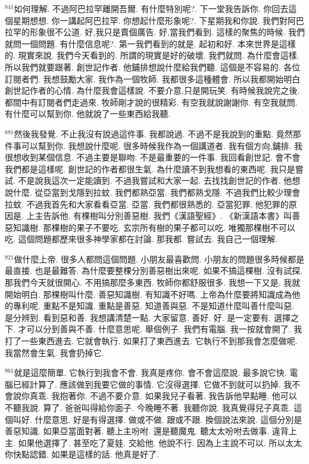 \documentclass{book}
\begin{document}
$^{841}$如何理解.
不過阿巴拉罕離開吾爾.
有什麼特別呢?.
下一堂我告訴你.
你回去這個星期想想.
你一講起阿巴拉罕.
你想起什麼形象呢?.
下星期我和你說.
我們對阿巴拉罕的形象很不公道.
好,我只是賣個廣告.
好,當我們看到.
這樣的聚焦的時候.
我們就問一個問題.
有什麼信息呢?.
第一我們看到的就是.
起初和好.
本來世界是這樣的.
現實來說.
我們今天看到的.
所謂的現實是好的破壞.
我們就問.
為什麼會這樣.
所以我們就要跟著.
創世記作者.
他鋪排想說什麼給我們聽.
這個是不容易的.
各位訂閱者們.
我想鼓勵大家.
我作為一個牧師.
我都很多這種體會.
所以我都開始明白創世記作者的心情.
為什麼我會這樣說.
不要介意,只是開玩笑.
有時候我說完之後.
都間中有訂閱者們走過來.
牧師剛才說的很精彩.
有空我就說謝謝你.
有空我就問.
有什麼可以幫到你.
他就說了一些東西給我聽.

$^{881}$然後我發覺.
不止我沒有說過這件事.
我都說過.
不過不是我說到的重點.
竟然那件事可以幫到你.
我想說什麼呢.
很多時候我作為一個講道者.
我有個方向,鋪排.
我很想收到某個信息.
不過主要是聯吻.
不是最重要的一件事.
我回看創世記.
會不會我們都是這樣呢.
創世記的作者都很生氣.
為什麼讀不到我想看的東西呢.
我只是嘗試.
不是說我這次一定能讀到.
不過我嘗試和大家一起.
去找找創世記的作者.
他想說什麼.
從亞當到戈隱到拉蚊.
我們都熟亞當.
我們都熟戈隱.
不過我們比較少理會拉蚊.
不過我首先和大家看看亞當.
亞當.
我們都很熟悉的.
亞當犯罪.
他犯罪的原因是.
上主告訴他.
有棵樹叫分別善惡樹.
我們《漢語聖經》.
《新漢語本書》叫善惡知識樹.
那棵樹的果子不要吃.
玄宗所有樹的果子都可以吃.
唯獨那棵樹不可以吃.
這個問題都歷來很多神學家都在討論.
那我都.
嘗試去.
我自己一個理解.

$^{921}$做什麼上帝.
很多人都問這個問題.
小朋友最喜歡問.
小朋友的問題很多時候都是最直接.
也是最難答.
為什麼要整棵分別善惡樹出來呢.
如果不搞這棵樹.
沒有試探.
那我們今天就很開心.
不用搞那麼多東西.
牧師你都舒服很多.
我想一下又是.
我就開始明白.
那棵樹叫什麼.
善惡知識樹.
有知識不好嗎.
上帝為什麼要將知識成為他的專利呢.
重點不是知識.
重點是善惡.
知道善與惡.
不是知道什麼叫善什麼叫惡.
是分辨到.
看到惡和善.
我想講清楚一點.
大家留意.
善好.
好.
是一定要有.
選擇之下.
才可以分到善與不善.
什麼意思呢.
舉個例子.
我們有電腦.
我一按就會開了.
我打了一些東西進去.
它就會執行.
如果打了東西進去.
它執行不到那我會怎麼做呢.
我當然會生氣.
我會扔掉它.

$^{961}$就是這麼簡單.
它執行到我會不會.
我真是疼你.
會不會這麼說.
最多說它快.
電腦已經計算了.
應該做到我要它做的事情.
它沒得選擇.
它做不到就可以扔掉.
我不會說你真乖.
我抱著你.
不過不要介意.
如果我兒子看著.
我告訴他早點睡.
他可以不聽我說.
算了.
爸爸叫得給你面子.
今晚睡不著.
我聽你說.
我真覺得兒子真乖.
這個叫好.
什麼意思.
好是有得選擇.
做或不做.
跟或不跟.
換個說法來說.
這個分別是善惡知識.
如果亞當面對著.
聽上主吩咐.
還是聽魔鬼.
聽太太吩咐去做事.
違背上主.
如果他選擇了.
甚至吃了夏娃.
交給他.
他說不行.
因為上主說不可以.
所以太太你快點認錯.
如果是這樣的話.
他真是好了.
\end{document}
